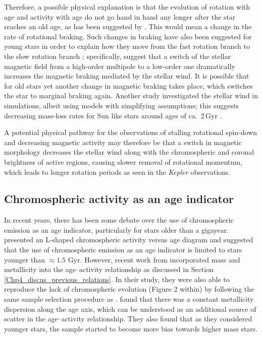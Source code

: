 Therefore, a possible physical explanation is that the evolution of rotation with age and activity with age do not go hand in hand any longer after the star reaches an old age, as has been suggested by \citet{Booth_etal_2017}. This would mean a change in the rate of rotational braking. Such changes in braking have also been suggested for young stars in order to explain how they move from the fast rotation branch to the slow rotation branch \citep{Garraffo_etal_2015, Garraffo_etal_2018}; specifically, \citet{Garraffo_etal_2016} suggest that a switch of the stellar magnetic field from a high-order multipole to a low-order one dramatically increases the magnetic braking mediated by the stellar wind. It is possible that for old stars yet another change in magnetic braking takes place, which switches the star to marginal braking again. Another study investigated the stellar wind in simulations, albeit using models with simplifying assumptions; this suggests decreasing mass-loss rates for Sun like stars around ages of ca.\ 2\,Gyr \citep{OFionnagain_Vidotto_2018}.

A potential physical pathway for the observations of stalling rotational spin-down and decreasing magnetic activity may therefore be that a switch in magnetic morphology decreases the stellar wind along with the chromospheric and coronal brightness of active regions, causing slower removal of rotational momentum, which leads to longer rotation periods as seen in the \textit{Kepler} observations.

\subsection{Chromospheric activity as an age indicator}

In recent years, there has been some debate over the use of chromospheric emission as an age indicator, particularly for stars older than a gigayear. \citet{Pace_2013} presented an L-shaped chromospheric activity versus age diagram and suggested that the use of chromospheric emission as an age indicator is limited to stars younger than $\approx 1.5$ Gyr. However, recent work from \citet{Lorenzo_Oliveira_etal_2016} incorporated mass and metallicity into the age--activity relationship as discussed in Section \ref{Chp4_discus_previous_relations}. In their study, they were also able to reproduce the lack of chromospheric evolution (Figure 2 within) by following the same sample selection procedure as \citet{Pace_2013}. \citet{Lorenzo_Oliveira_etal_2016} found that there was a constant metallicity dispersion along the age axis, which can be understood as an additional source of scatter in the age--activity relationship. They also found that as they considered younger stars, the sample started to become more bias towards higher mass stars.

